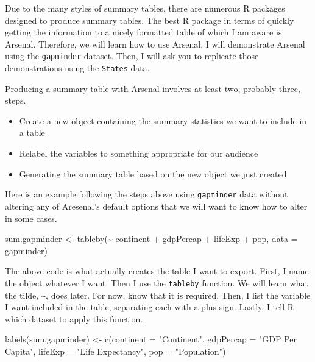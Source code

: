 \documentclass[
]{book}
\makeatletter
\newenvironment{Shaded}{\begin{snugshade}}{\end{snugshade}}
\newcommand{\AttributeTok}[1]{\textcolor[rgb]{0.61,0.61,0.61}{#1}}
\newcommand{\FunctionTok}[1]{\textcolor[rgb]{0,0,0}{#1}}
\newcommand{\NormalTok}[1]{#1}
\newcommand{\OtherTok}[1]{\textcolor[rgb]{0.37,0.37,0.37}{#1}}
\newcommand{\SpecialCharTok}[1]{\textcolor[rgb]{0,0,0}{#1}}
\newcommand{\StringTok}[1]{\textcolor[rgb]{0.5,0.5,0.5}{#1}}
\providecommand{\tightlist}{%
  \setlength{\itemsep}{0pt}\setlength{\parskip}{0pt}}
\newenvironment{kframe}{%
\medskip{}
\setlength{\fboxsep}{.8em}
 \def\at@end@of@kframe{}%
 \ifinner\ifhmode%
  \def\at@end@of@kframe{\end{minipage}}%
  \begin{minipage}{\columnwidth}%
 \fi\fi%
 \def\FrameCommand##1{\hskip\@totalleftmargin \hskip-\fboxsep
 \colorbox{shadecolor}{##1}\hskip-\fboxsep
     \hskip-\linewidth \hskip-\@totalleftmargin \hskip\columnwidth}%
 \MakeFramed {\advance\hsize-\width
   \@totalleftmargin\z@ \linewidth\hsize
   \@setminipage}}%
 {\par\unskip\endMakeFramed%
 \at@end@of@kframe}
\renewenvironment{Shaded}{\begin{kframe}}{\end{kframe}}
\makeatother
\begin{document}
Due to the many styles of summary tables, there are numerous R packages designed to produce summary tables. The best R package in terms of quickly getting the information to a nicely formatted table of which I am aware is Arsenal. Therefore, we will learn how to use Arsenal. I will demonstrate Arsenal using the \texttt{gapminder} dataset. Then, I will ask you to replicate those demonstrations using the \texttt{States} data.

Producing a summary table with Arsenal involves at least two, probably three, steps.

\begin{itemize}
\tightlist
\item
  Create a new object containing the summary statistics we want to include in a table
\item
  Relabel the variables to something appropriate for our audience
\item
  Generating the summary table based on the new object we just created
\end{itemize}

Here is an example following the steps above using \texttt{gapminder} data without altering any of Aresenal's default options that we will want to know how to alter in some cases.

\begin{Shaded}
\begin{Highlighting}[]
\NormalTok{sum.gapminder }\OtherTok{\textless{}{-}} \FunctionTok{tableby}\NormalTok{(}\SpecialCharTok{\textasciitilde{}}\NormalTok{ continent }\SpecialCharTok{+}\NormalTok{ gdpPercap }\SpecialCharTok{+}\NormalTok{ lifeExp }\SpecialCharTok{+}\NormalTok{ pop, }\AttributeTok{data =}\NormalTok{ gapminder)}
\end{Highlighting}
\end{Shaded}

The above code is what actually creates the table I want to export. First, I name the object whatever I want. Then I use the \texttt{tableby} function. We will learn what the tilde, \texttt{\textasciitilde{}}, does later. For now, know that it is required. Then, I list the variable I want included in the table, separating each with a plus sign. Lastly, I tell R which dataset to apply this function.

\begin{Shaded}
\begin{Highlighting}[]
\FunctionTok{labels}\NormalTok{(sum.gapminder) }\OtherTok{\textless{}{-}} \FunctionTok{c}\NormalTok{(}\AttributeTok{continent =} \StringTok{"Continent"}\NormalTok{, }\AttributeTok{gdpPercap =} \StringTok{"GDP Per Capita"}\NormalTok{, }\AttributeTok{lifeExp =} \StringTok{"Life Expectancy"}\NormalTok{, }\AttributeTok{pop =} \StringTok{"Population"}\NormalTok{)}
\end{Highlighting}
\end{Shaded}
\end{document}
